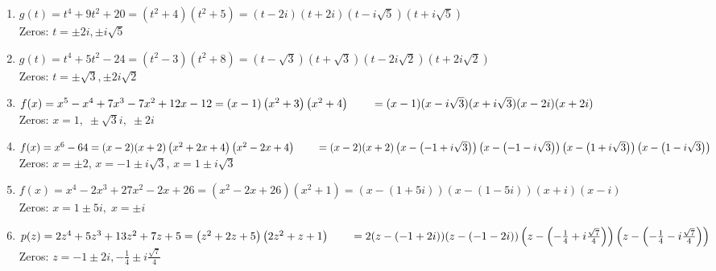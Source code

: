 \begin{enumerate}
\item  $g(t) = t^4+9t^2+20 = \left(t^2+4\right) \left(t^2+5\right) = (t-2i)(t+2i)\left(t - i \sqrt{5}\right)\left(t + i \sqrt{5}\right)$\\
Zeros:  $t = \pm 2i, \pm i \sqrt{5}$
\item  $g(t) = t^4+5t^2-24 = \left(t^2-3 \right) \left(t^2+8\right) = (t-\sqrt{3})(t+\sqrt{3})\left(t - 2i \sqrt{2}\right)\left(t + 2i \sqrt{2}\right)$\\
Zeros:  $t = \pm \sqrt{3}, \pm 2i \sqrt{2}$

\item  $f(x) = x^5 - x^4+7x^3-7x^2+12x-12 = (x-1) \left(x^2 + 3\right) \left(x^2 + 4 \right) \\
\phantom{f(x)} = (x-1)(x - i \sqrt{3})(x + i \sqrt{3})(x-2i)(x+2i)$ \\
Zeros:  $x = 1, \;  \pm  \sqrt{3}i,  \; \pm 2i$
\item $f(x) = x^6 - 64 = (x-2)(x+2)\left(x^2+2x+4\right)\left(x^2-2x+4\right) \\
      \phantom{f(x)} = (x-2)(x+2)\left( x - \left( -1+i\sqrt{3} \right) \right)\left( x - \left( -1-i\sqrt{3} \right) \right)\left( x - \left( 1+i\sqrt{3} \right) \right)\left( x - \left( 1-i\sqrt{3} \right) \right)$ \\
Zeros:  $x = \pm 2$, $x = -1 \pm i\sqrt{3}$, $x = 1 \pm i\sqrt{3}$


\item $f(x) = x^{4} - 2x^{3} + 27x^{2} - 2x + 26 = (x^{2} - 2x + 26)(x^{2} + 1) = (x - (1 + 5i))(x - (1 - 5i))(x + i)(x - i)$\\ 
Zeros: $x = 1 \pm 5i, \; x = \pm i$
\item  $p(z) = 2z^4+5z^3+13z^2+7z+5 = \left(z^2+2z+5\right) \left(2z^2+z+1\right)  \\ \phantom{f(z)} = 2 (z-(-1+2i))(z-(-1-2i))\left(z - \left(-\frac{1}{4} + i \frac{\sqrt{7}}{4}\right) \right)\left(z - \left(-\frac{1}{4} - i \frac{\sqrt{7}}{4}\right) \right) $\\
Zeros:  $z = -1 \pm 2i, -\frac{1}{4} \pm i \frac{\sqrt{7}}{4}$

\setcounter{HW}{\value{enumi}}
\end{enumerate}

